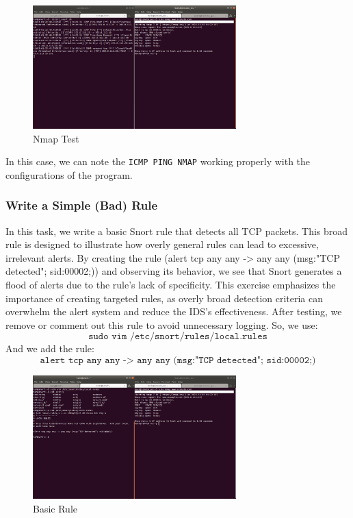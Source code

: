 \documentclass[a4paper,11pt]{article} %
\begin{document}
\begin{figure}[h!]
    \centering
    \includegraphics[width=0.7\textwidth]{images/16.png}
    \caption{Nmap Test}
\end{figure}
In this case, we can note the \texttt{ICMP PING NMAP} working properly with the configurations of the program.

\subsubsection{Write a Simple (Bad) Rule}
In this task, we write a basic Snort rule that detects all TCP packets. This broad rule is designed to illustrate how overly general rules can lead to excessive, irrelevant alerts. By creating the rule (alert tcp any any -> any any (msg:"TCP detected"; sid:00002;)) and observing its behavior, we see that Snort generates a flood of alerts due to the rule’s lack of specificity. This exercise emphasizes the importance of creating targeted rules, as overly broad detection criteria can overwhelm the alert system and reduce the IDS’s effectiveness. After testing, we remove or comment out this rule to avoid unnecessary logging.
So, we use:
\[\texttt{sudo vim /etc/snort/rules/local.rules}\]
And we add the rule:
\[\texttt{alert tcp any any -> any any (msg:"TCP detected"; sid:00002;)}\]

\begin{figure}[h!]
    \centering
    \includegraphics[width=0.7\textwidth]{images/17.png}
    \caption{Basic Rule}
\end{figure}
\end{document}
